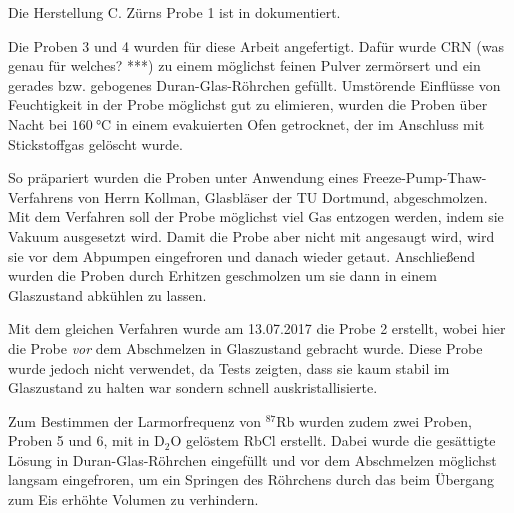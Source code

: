 Die Herstellung C. Zürns Probe 1 ist in \cite{zuern_arbeit} dokumentiert.

Die Proben 3 und 4 wurden für diese Arbeit angefertigt. Dafür wurde CRN (was genau für welches? ***) zu einem möglichst feinen Pulver zermörsert und ein gerades bzw. gebogenes Duran-Glas-Röhrchen gefüllt. Umstörende Einflüsse von Feuchtigkeit in der Probe möglichst gut zu elimieren, wurden die Proben über Nacht bei $\SI{160}{\degreeCelsius}$ in einem evakuierten Ofen getrocknet, der im Anschluss mit Stickstoffgas gelöscht wurde.

So präpariert wurden die Proben unter Anwendung eines Freeze-Pump-Thaw-Ver\-fah\-rens von Herrn Kollman, Glasbläser der TU Dortmund, abgeschmolzen. Mit dem Verfahren soll der Probe möglichst viel Gas entzogen werden, indem sie Vakuum ausgesetzt wird. Damit die Probe aber nicht mit angesaugt wird, wird sie vor dem Abpumpen eingefroren und danach wieder getaut. Anschließend wurden die Proben durch Erhitzen geschmolzen um sie dann in einem Glaszustand abkühlen zu lassen.

Mit dem gleichen Verfahren wurde am 13.07.2017 die Probe 2 erstellt, wobei hier die Probe \emph{vor} dem Abschmelzen in Glaszustand gebracht wurde. Diese Probe wurde jedoch nicht verwendet, da Tests zeigten, dass sie kaum stabil im Glaszustand zu halten war sondern schnell auskristallisierte.

Zum Bestimmen der Larmorfrequenz von $^\text{87}$Rb wurden zudem zwei Proben, Proben 5 und 6, mit in D$_\text{2}$O gelöstem RbCl erstellt. Dabei wurde die gesättigte Lösung in Duran-Glas-Röhrchen eingefüllt und vor dem Abschmelzen möglichst langsam eingefroren, um ein Springen des Röhrchens durch das beim Übergang zum Eis erhöhte Volumen zu verhindern.
